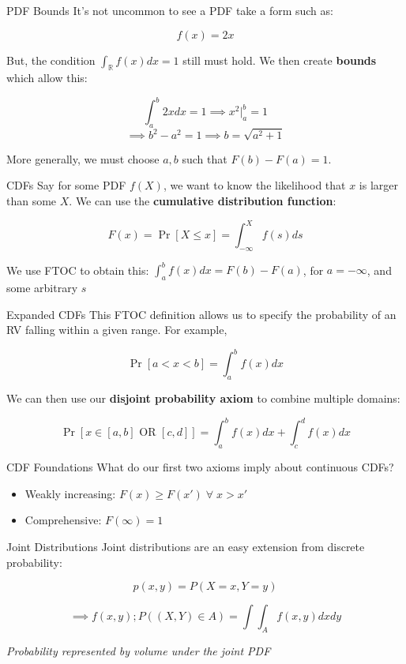 \documentclass[10pt]{beamer}
\begin{document}
\begin{frame}{PDF Bounds}
    It's not uncommon to see a PDF take a form such as:

    \[f(x) = 2x\]

    But, the condition $\int_{\mathbb{R}} f(x)dx = 1$ still must hold. We then create \textbf{bounds} which allow this: \pause

    \[\int_a^b 2xdx = 1 \implies x^2 \bigg|_a^b = 1\]
    \[\implies b^2 - a^2 = 1 \implies b = \sqrt{a^2+1} \]

    More generally, we must choose $a,b$ such that $F(b)-F(a) = 1$.
\end{frame}

\begin{frame}{CDFs}
    Say for some PDF $f(X)$, we want to know the likelihood that $x$ is larger than some $X$. We can use the \textbf{cumulative distribution function}:

    \[F(x) = \Pr[X \leq x] = \int_{-\infty}^X f(s) ds\]

    We use FTOC to obtain this: $\int_a^b f(x)dx = F(b) - F(a)$, for $a = - \infty$, and some arbitrary $s$
\end{frame}

\begin{frame}{Expanded CDFs}
    This FTOC definition allows us to specify the probability of an RV falling within a given range. For example,

    \[\Pr[a < x < b] = \int_a^b f(x)dx\] \pause

    We can then use our \textbf{disjoint probability axiom} to combine multiple domains:

    \[\Pr[x \in [a,b] \text{ OR } [c,d]] = \int_a^b f(x)dx + \int_c^d f(x)dx\]
\end{frame}

\begin{frame}{CDF Foundations}
    What do our first two axioms imply about continuous CDFs? \pause \\
\vspace{1cm}
    \begin{itemize}
        \item Weakly increasing: $F(x) \ge F(x') \; \forall \; x > x'$
        \item Comprehensive: $F(\infty) = 1$
    \end{itemize}
\end{frame}

\begin{frame}{Joint Distributions}
    Joint distributions are an easy extension from discrete probability:

    \[p(x,y) = P(X = x, Y = y)\]

    \[\implies f(x,y); P((X,Y) \in A) = \int \int_A f(x,y)dxdy\]

    \textit{Probability represented by volume under the joint PDF}
\end{frame}
\end{document}
